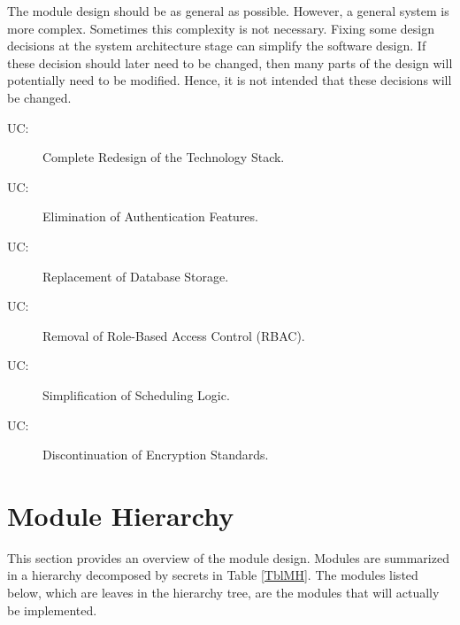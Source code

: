 \documentclass[12pt, titlepage]{article}
\newcounter{ucnum}
\newcommand{\uctheucnum}{UC\theucnum}
\begin{document}
The module design should be as general as possible. However, a general system is
more complex. Sometimes this complexity is not necessary. Fixing some design
decisions at the system architecture stage can simplify the software design. If
these decision should later need to be changed, then many parts of the design
will potentially need to be modified. Hence, it is not intended that these
decisions will be changed.

\begin{description}
\item[ \uctheucnum \label{ucTechStack}:] Complete Redesign of the Technology Stack.
\item[ \uctheucnum \label{ucAuthFeatures}:] Elimination of Authentication Features.
\item[ \uctheucnum \label{ucDataStores}:] Replacement of Database Storage.
\item[ \uctheucnum \label{ucRBAC}:] Removal of Role-Based Access Control (RBAC).
\item[ \uctheucnum \label{ucSchedLogic}:] Simplification of Scheduling Logic.
\item[ \uctheucnum \label{ucEncryptStandard}:] Discontinuation of Encryption Standards.
\end{description}

\section{Module Hierarchy} \label{SecMH}

This section provides an overview of the module design. Modules are summarized
in a hierarchy decomposed by secrets in Table \ref{TblMH}. The modules listed
below, which are leaves in the hierarchy tree, are the modules that will
actually be implemented.
\end{document}

